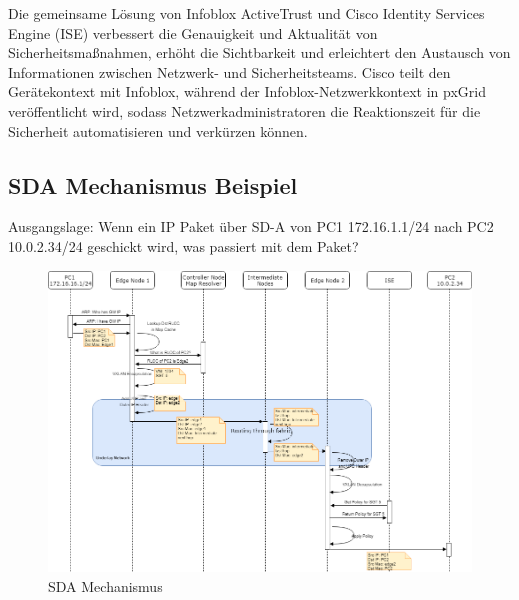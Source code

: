 Die gemeinsame Lösung von Infoblox ActiveTrust und Cisco Identity Services Engine (ISE) verbessert die Genauigkeit und Aktualität von Sicherheitsmaßnahmen, erhöht die Sichtbarkeit und erleichtert den Austausch von Informationen zwischen Netzwerk- und Sicherheitsteams. Cisco teilt den Gerätekontext mit Infoblox, während der Infoblox-Netzwerkkontext in pxGrid veröffentlicht wird, sodass Netzwerkadministratoren die Reaktionszeit für die Sicherheit automatisieren und verkürzen können.\cite{infoblox-communityblog}



\subsection{SDA Mechanismus Beispiel}

Ausgangslage: Wenn ein IP Paket über SD-A von PC1 172.16.1.1/24 nach PC2 10.0.2.34/24 geschickt wird, was passiert mit dem Paket?

\begin{figure}[H]
	\centering
	\includegraphics[width=16cm]{img/SDA_Mechanismus-NewVersion.png}
	\caption{SDA Mechanismus}
	\label{fig:SDA Mechanismus}
\end{figure}

